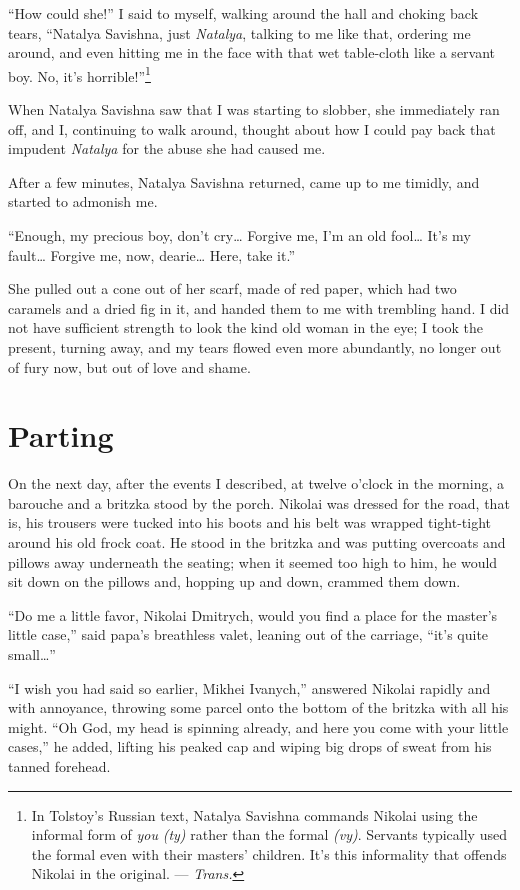 ``How could she!'' I said to myself, walking around the hall and choking back tears, ``Natalya Savishna, just \emph{Natalya}, talking to me like that, ordering me around, and even hitting me in the face with that wet table-cloth like a servant boy. No, it's horrible!''\footnote{In Tolstoy's Russian text, Natalya Savishna commands Nikolai using the informal form of \textit{you} \textit{(ty)} rather than the formal \textit{(vy)}. Servants typically used the formal even with their masters' children. It's this informality that offends Nikolai in the original. --- \textit{Trans.}}

When Natalya Savishna saw that I was starting to slobber, she immediately ran off, and I, continuing to walk around, thought about how I could pay back that impudent \emph{Natalya} for the abuse she had caused me.

After a few minutes, Natalya Savishna returned, came up to me timidly, and started to admonish me.

``Enough, my precious boy, don't cry\ldots{} Forgive me, I'm an old fool\ldots{} It's my fault\ldots{} Forgive me, now, dearie\ldots{} Here, take it.'' %

She pulled out a cone out of her scarf, made of red paper, which had two caramels and a dried fig in it, and handed them to me with trembling hand. I did not have sufficient strength to look the kind old woman in the eye; I took the present, turning away, and my tears flowed even more abundantly, no longer out of fury now, but out of love and shame.

\chapter{Parting} %

On the next day, after the events I described, at twelve o'clock in the morning, a barouche and a britzka stood by the porch. Nikolai was dressed for the road, that is, his trousers were tucked into his boots and his belt was wrapped tight-tight around his old frock coat. He stood in the britzka and was putting overcoats and pillows away underneath the seating; when it seemed too high to him, he would sit down on the pillows and, hopping up and down, crammed them down.

``Do me a little favor, Nikolai Dmitrych, would you find a place for the master's little case,'' said papa's breathless valet, leaning out of the carriage, ``it's quite small\ldots{}'' %

``I wish you had said so earlier, Mikhei Ivanych,'' answered Nikolai rapidly and with annoyance, throwing some parcel onto the bottom of the britzka with all his might. ``Oh God, my head is spinning already, and here you come with your little cases,'' he added, lifting his peaked cap and wiping big drops of sweat from his tanned forehead. %

